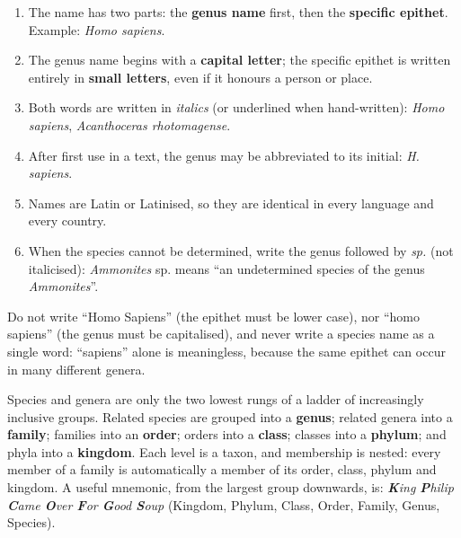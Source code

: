 \documentclass[11pt]{article}
\newcounter{popsec}
\newcounter{popsub}
\newcommand{\courssub}[1]{%
  \stepcounter{popsub}%
  \par\vspace{9pt}\noindent{\popxbold\fontsize{11.5}{13}\selectfont\color{popink}{\color{poporange}\thepopsec.\thepopsub}\hspace{6pt}#1}\par\nopagebreak\vspace{4pt}
}
\begin{document}
\begin{methode}
\begin{enumerate}
\item The name has two parts: the \textbf{genus name} first, then the \textbf{specific epithet}. Example: \emph{Homo sapiens}.
\item The genus name begins with a \textbf{capital letter}; the specific epithet is written entirely in \textbf{small letters}, even if it honours a person or place.
\item Both words are written in \emph{italics} (or underlined when hand-written): \emph{Homo sapiens}, \emph{Acanthoceras rhotomagense}.
\item After first use in a text, the genus may be abbreviated to its initial: \emph{H. sapiens}.
\item Names are Latin or Latinised, so they are identical in every language and every country.
\item When the species cannot be determined, write the genus followed by \emph{sp.} (not italicised): \emph{Ammonites} sp. means ``an undetermined species of the genus \emph{Ammonites}''.
\end{enumerate}
\end{methode}

\begin{attention}
Do not write ``Homo Sapiens'' (the epithet must be lower case), nor ``homo sapiens'' (the genus must be capitalised), and never write a species name as a single word: ``sapiens'' alone is meaningless, because the same epithet can occur in many different genera.
\end{attention}

\courssub{The Taxonomic Hierarchy}

Species and genera are only the two lowest rungs of a ladder of increasingly inclusive groups. Related species are grouped into a \textbf{genus}; related genera into a \textbf{family}; families into an \textbf{order}; orders into a \textbf{class}; classes into a \textbf{phylum}; and phyla into a \textbf{kingdom}. Each level is a taxon, and membership is nested: every member of a family is automatically a member of its order, class, phylum and kingdom. A useful mnemonic, from the largest group downwards, is: \emph{\textbf{K}ing \textbf{P}hilip \textbf{C}ame \textbf{O}ver \textbf{F}or \textbf{G}ood \textbf{S}oup} (Kingdom, Phylum, Class, Order, Family, Genus, Species).
\end{document}
